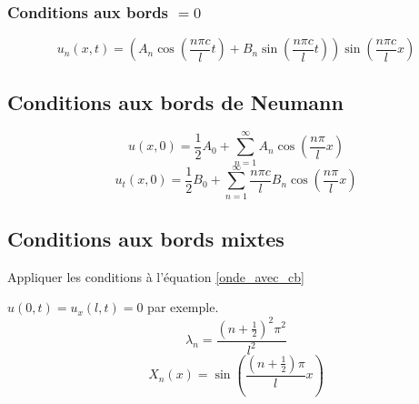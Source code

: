 \documentclass[resume]{subfiles}
\begin{document}
\subsubsection{Conditions aux bords $=0$}
\begin{scriptsize}
$$\boxed{u_n(x,t)=\left(A_n\cos\left(\frac{n\pi c}{l}t\right)+B_n\sin\left(\frac{n\pi c}{l}t\right)\right)\sin\left(\frac{n\pi c}{l}x\right)}$$
\end{scriptsize}
\subsection{Conditions aux bords de Neumann}
$$u(x,0)=\frac{1}{2}A_0+\sum_{n=1}^{\infty}A_n\cos\left(\frac{n\pi}{l}x\right)$$
$$u_t(x,0)=\frac{1}{2}B_0+\sum_{n=1}^{\infty}\frac{n\pi c}{l}B_n\cos\left(\frac{n\pi}{l}x\right)$$
\subsection{Conditions aux bords mixtes}
Appliquer les conditions à l'équation \ref{onde_avec_cb}



$u(0,t)=u_x(l,t)=0$ par exemple.
$$\lambda_n=\frac{\left(n+\frac{1}{2}\right)^2\pi^2}{l^2}$$
$$X_n(x)=\sin\left(\frac{\left(n+\frac{1}{2}\right)\pi}{l}x\right)$$
\end{document}
